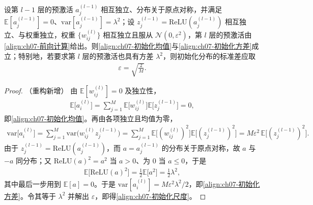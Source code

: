 \documentclass[../../main.tex]{subfiles}
\begin{document}
\begin{proposition}[He 初始化的方差传播]\label{proposition:ch07-初始化方差}
设第 $l-1$ 层的预激活 $a_j^{(l-1)}$ 相互独立、分布关于原点对称，并满足 $\mathbb{E}[a_j^{(l-1)}]=0$、$\mathrm{var}[a_j^{(l-1)}]=\lambda^{2}$；设 $z_j^{(l-1)}=\mathrm{ReLU}(a_j^{(l-1)})$ 相互独立、与权重独立，权重 $\{w_{ij}^{(l)}\}$ 相互独立且服从 $\mathcal{N}(0,\varepsilon^{2})$，第 $l$ 层的预激活由\eqref{align:ch07-前向计算}给出。则\eqref{align:ch07-初始化均值}与\eqref{align:ch07-初始化方差}成立；特别地，若要求第 $l$ 层的预激活也具有方差 $\lambda^{2}$，则初始化分布的标准差应取
\begin{align}
\varepsilon = \sqrt{\frac{2}{M}}.
\label{align:ch07-初始化尺度}
\end{align}
\end{proposition}
\begin{proof}（重构新增）
由 $\mathbb{E}[w_{ij}^{(l)}]=0$ 及独立性，
\begin{align*}
\mathbb{E}\bigl[a_i^{(l)}\bigr] = \sum_{j=1}^{M}\mathbb{E}\bigl[w_{ij}^{(l)}\bigr]\mathbb{E}\bigl[z_j^{(l-1)}\bigr] = 0,
\end{align*}
即\eqref{align:ch07-初始化均值}。再由各项独立且均值为零，
\begin{align*}
\mathrm{var}\bigl[a_i^{(l)}\bigr] = \sum_{j=1}^{M}\mathrm{var}\bigl(w_{ij}^{(l)}z_j^{(l-1)}\bigr)
= \sum_{j=1}^{M}\mathbb{E}\bigl[(w_{ij}^{(l)})^{2}\bigr]\mathbb{E}\bigl[(z_j^{(l-1)})^{2}\bigr]
= M\varepsilon^{2}\,\mathbb{E}\bigl[(z_j^{(l-1)})^{2}\bigr].
\end{align*}
由于 $z_j^{(l-1)}=\mathrm{ReLU}(a_j^{(l-1)})$，而 $a=a_j^{(l-1)}$ 的分布关于原点对称，故 $a$ 与 $-a$ 同分布；又 $\mathrm{ReLU}(a)^{2}=a^{2}$ 当 $a>0$、为 $0$ 当 $a\leqslant0$，于是
\begin{align*}
\mathbb{E}\bigl[\mathrm{ReLU}(a)^{2}\bigr] = \frac{1}{2}\mathbb{E}\bigl[a^{2}\bigr] = \frac{1}{2}\lambda^{2},
\end{align*}
其中最后一步用到 $\mathbb{E}[a]=0$。于是 $\mathrm{var}[a_i^{(l)}]=M\varepsilon^{2}\lambda^{2}/2$，即\eqref{align:ch07-初始化方差}。令其等于 $\lambda^{2}$ 并解出 $\varepsilon$，即得\eqref{align:ch07-初始化尺度}。
\end{proof}
\end{document}
